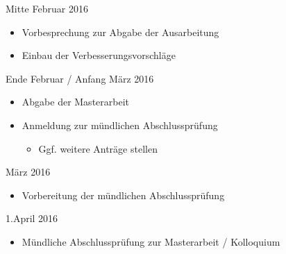 \documentclass[paper=a4, pagesize, DIV=calc, BCOR=12.5mm, twoside=off, onecolumn=on, open = any, titlepage =on, parskip =half-, headsepline = on, footsepline = on, chapterprefix = on, appendixprefix = off, fontsize = 12pt, numbers = noenddot, abstract = on]{scrbook}
\numberwithin{equation}{chapter}
\begin{document}
Mitte Februar 2016
\begin{itemize}
\item Vorbesprechung zur Abgabe der Ausarbeitung
\item Einbau der Verbesserungsvorschläge
\end{itemize}

Ende Februar / Anfang März 2016
\begin{itemize}
\item Abgabe der Masterarbeit
\item Anmeldung zur mündlichen Abschlussprüfung
\begin{itemize}
\item Ggf. weitere Anträge stellen
\end{itemize}
\end{itemize}

März 2016
\begin{itemize}
\item Vorbereitung der mündlichen Abschlussprüfung
\end{itemize}

1.April 2016
\begin{itemize}
\item Mündliche Abschlussprüfung zur Masterarbeit / Kolloquium
\end{itemize}



\end{document}
